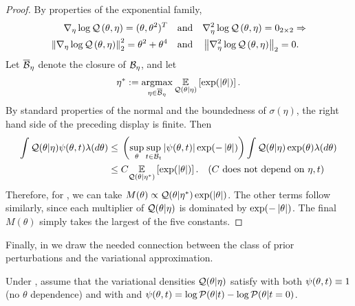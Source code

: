 \begin{lem}
\begin{proof}
%
By properties of the exponential family,
%
\begin{align*}
%
\lqgrad{\theta, \eta} ={} (\theta, \theta^2)^T \mathand&
\lqhess{\theta, \eta} ={} 0_{2\times2} \Rightarrow\\
%
\norm{\lqgrad{\theta, \eta}}_2^2 ={} \theta^2 + \theta^4 \mathand&
\norm{\lqhess{\theta, \eta}}_2 ={} 0.
%
\end{align*}
%
Let $\overline{\mathcal{B}}_\eta$ denote the closure of $\mathcal{B}_\eta$, and let
%
\begin{align*}
%
\eta^* := \argmax_{\eta \in \ballclosed_\eta}
    \expect{\q(\theta \vert \eta)}{\exp(\abs{\theta})}.
%
\end{align*}
%
By standard properties of the normal and the boundedness of $\sigma(\eta)$, the
right hand side of the preceding display is finite.
%
Then
%
\begin{align*}
\int \q(\theta \vert \eta) \psi(\theta, \t) \lambda(d \theta) \le{}&
    \left( \sup_{\theta} \sup_{\t \in \ball_\t}
        \abs{\psi(\theta, \t)} \exp(-\abs{\theta}) \right)
    \int \q(\theta \vert \eta) \exp(\theta) \lambda(d \theta)
%
\\\le{}&
    \const
    \expect{\q(\theta \vert \eta^*)}{\exp(\abs{\theta})}.
    \quad\constdesc{\eta, \t}
%
\end{align*}
%
Therefore, for , we can take $M(\theta)
\propto \mathcal{Q}(\theta \vert \eta^*) \exp(\left|\theta\right|)$. The other terms follow
similarly, since each multiplier of $\mathcal{Q}(\theta \vert \eta)$ is dominated by
$\exp(-\left|\theta\right|)$.  The final $M(\theta)$ simply takes the largest
of the five constants.
%
\end{proof}
%
\end{lem}

Finally, in  we draw the needed connection between the
class of prior perturbations and the variational approximation.

\begin{assu}
%
Under , assume that the variational densities $\mathcal{Q}(\theta \vert
\eta)$ satisfy  with both $\psi(\theta, t) \equiv 1$ (no
$\theta$ dependence) and with and $\psi(\theta, t) = \log \mathcal{P}(\theta \vert t) -
\log \mathcal{P}(\theta \vert t=0)$.
%
\end{assu}

